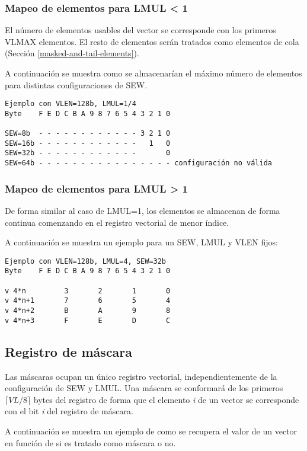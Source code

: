 \subsubsection{Mapeo de elementos para LMUL < 1}
El número de elementos usables del vector se corresponde con los primeros VLMAX
elementos. El resto de elementos serán tratados como elementos de cola
(Sección \ref{masked-and-tail-elements}).

A continuación se muestra como se almacenarían el máximo número de elementos
para distintas configuraciones de SEW.
\begin{lstlisting}
Ejemplo con VLEN=128b, LMUL=1/4
Byte    F E D C B A 9 8 7 6 5 4 3 2 1 0

SEW=8b  - - - - - - - - - - - - 3 2 1 0
SEW=16b - - - - - - - - - - - -   1   0
SEW=32b - - - - - - - - - - - -       0
SEW=64b - - - - - - - - - - - - - - - - configuración no válida
\end{lstlisting}


\subsubsection{Mapeo de elementos para LMUL > 1}
De forma similar al caso de LMUL=1, los elementos se almacenan de forma
continua comenzando en el registro vectorial de menor índice.

A continuación se muestra un ejemplo para un SEW, LMUL y VLEN fijos:
\begin{lstlisting}
Ejemplo con VLEN=128b, LMUL=4, SEW=32b
Byte    F E D C B A 9 8 7 6 5 4 3 2 1 0

v 4*n         3       2       1       0
v 4*n+1       7       6       5       4 
v 4*n+2       B       A       9       8
v 4*n+3       F       E       D       C 
\end{lstlisting}

\subsection{Registro de máscara}{\label{mask-reg}}
Las máscaras ocupan un único registro vectorial, independientemente de la
configuración de SEW y LMUL. Una máscara se conformará de los primeros $\lceil
VL/8\rceil$ bytes del registro de forma que el elemento
\textit{i} de un vector se corresponde con el bit \textit{i} del registro de
máscara.

A continuación se muestra un ejemplo de como se recupera el
valor de un vector en función de si es tratado como máscara o no.

